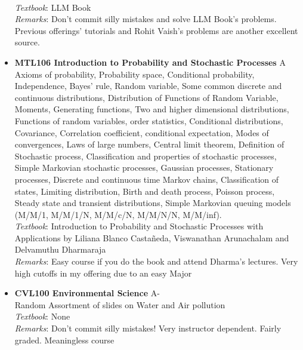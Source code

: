 \documentclass[a4paper]{article}
\begin{document}
\begin{itemize}
    \\
    \textit{Textbook}: LLM Book
    \\
    \textit{Remarks}: Don't commit silly mistakes and solve LLM Book's problems. Previous offerings' tutorials and Rohit Vaish's problems are another excellent source.
    \item \textbf{MTL106 Introduction to Probability and Stochastic Processes} {\color{red}A}
    \\
    Axioms of probability, Probability space, Conditional probability, Independence, Bayes’ rule, Random variable, Some common discrete and continuous distributions, Distribution of Functions of Random Variable, Moments, Generating functions, Two and higher dimensional distributions, Functions of random variables, order statistics, Conditional distributions, Covariance, Correlation coefficient, conditional expectation, Modes of convergences, Laws of large numbers, Central limit theorem, Definition of Stochastic process, Classification and properties of stochastic processes, Simple Markovian stochastic processes, Gaussian processes, Stationary processes, Discrete and continuous time Markov chains, Classification of states, Limiting distribution, Birth and death process, Poisson process, Steady state and transient distributions, Simple Markovian queuing models (M/M/1, M/M/1/N, M/M/c/N, M/M/N/N, M/M/inf).
    \\
    \textit{Textbook}: Introduction to Probability and Stochastic Processes with Applications by Liliana Blanco Castañeda, Viswanathan Arunachalam and Delvamuthu Dharmaraja
    \\
    \textit{Remarks}: Easy course if you do the book and attend Dharma's lectures. Very high cutoffs in my offering due to an easy Major
    \item \textbf{CVL100 Environmental Science} {\color{red}A-}
    \\
    Random Assortment of slides on Water and Air pollution
    \\
    \textit{Textbook}: None
    \\
    \textit{Remarks}: Don't commit silly mistakes! Very instructor dependent. Fairly graded. Meaningless course
    
\end{itemize}
\newpage
\end{document}
